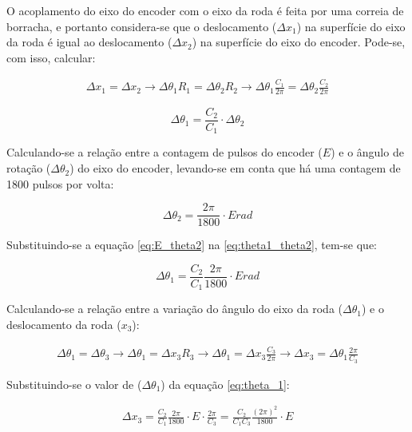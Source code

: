 O acoplamento do eixo do encoder com o eixo da roda é feita por uma correia de borracha, e portanto considera-se que o deslocamento ($ \Delta x_1$) na superfície do eixo da roda é igual ao deslocamento ($ \Delta x_2$) na superfície do eixo do encoder. Pode-se, com isso, calcular:

\begin{eqnarray*}
   \Delta x_1 =  \Delta x_2 \rightarrow \Delta \theta_1 R_1 = \Delta \theta_2 R_2 \rightarrow \Delta \theta_1 \frac{C_1}{2 \pi} = \Delta \theta_2 \frac{C_2}{2 \pi} 
\end{eqnarray*}

\begin{equation}
  \Delta \theta_1 = \frac{C_2}{C_1} \cdot \Delta \theta_2
  \label{eq:theta1_theta2}
\end{equation}

Calculando-se a relação entre a contagem de pulsos do encoder ($E$) e o ângulo de rotação ($\Delta \theta_2$) do eixo do encoder, levando-se em conta que há uma contagem de 1800 pulsos por volta:

\begin{equation}
  \Delta \theta_2 = \frac{2 \pi}{1800} \cdot E \unit{rad}
  \label{eq:E_theta2}
\end{equation}

Substituindo-se a equação \ref{eq:E_theta2} na \ref{eq:theta1_theta2}, tem-se que:

\begin{equation}
  \Delta \theta_1 = \frac{C_2}{C_1} \frac{2 \pi}{1800} \cdot E \unit{rad}
  \label{eq:theta_1}
\end{equation}

Calculando-se a relação entre a variação do ângulo do eixo da roda ($\Delta \theta_1$) e o deslocamento da roda ($x_3$):

\begin{eqnarray*}
  \Delta \theta_1 = \Delta \theta_3 \rightarrow \Delta \theta_1 =  \Delta x_3 R_3 \rightarrow \Delta \theta_1 = \Delta x_3 \frac{C_3}{2 \pi} \rightarrow  \Delta x_3 = \Delta \theta_1 \frac{2 \pi}{C_3}
\end{eqnarray*}

Substituindo-se o valor de ($\Delta \theta_1$) da equação \ref{eq:theta_1}:

\begin{eqnarray*}
   \Delta x_3 = \frac{C_2}{C_1} \frac{2 \pi}{1800} \cdot E \cdot \frac{2 \pi}{C_3} = \frac{C_2}{C_1 C_3} \frac{(2 \pi)^2}{1800} \cdot E
\end{eqnarray*}


